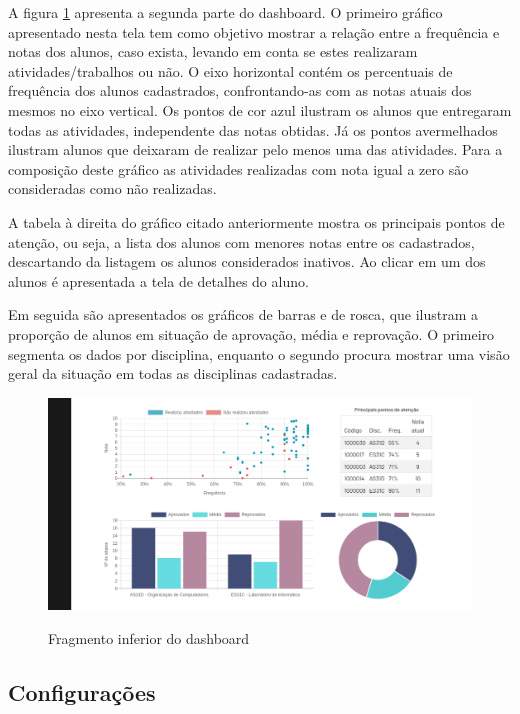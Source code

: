 A figura \ref{fig:dashboard-2} apresenta a segunda parte do dashboard. 
O primeiro gráfico apresentado nesta tela tem como objetivo mostrar a relação entre a frequência e notas dos alunos, caso exista, levando em conta se estes realizaram atividades/trabalhos ou não.
O eixo horizontal contém os percentuais de frequência dos alunos cadastrados, confrontando-as com as notas atuais dos mesmos no eixo vertical. 
Os pontos de cor azul ilustram os alunos que entregaram todas as atividades, independente das notas obtidas. 
Já os pontos avermelhados ilustram alunos que deixaram de realizar pelo menos uma das atividades.
Para a composição deste gráfico as atividades realizadas com nota igual a zero são consideradas como não realizadas.

A tabela à direita do gráfico citado anteriormente mostra os principais pontos de atenção, ou seja, a lista dos alunos com menores notas entre os cadastrados, descartando da listagem os alunos considerados inativos. Ao clicar em um dos alunos é apresentada a tela de detalhes do aluno.

Em seguida são apresentados os gráficos de barras e de rosca, que ilustram a proporção de alunos em situação de aprovação, média e reprovação. O primeiro segmenta os dados por disciplina, enquanto o segundo procura mostrar uma visão geral da situação em todas as disciplinas cadastradas.

\begin{figure}[!htb]
    \centering
    \caption{Fragmento inferior do dashboard}
    \includegraphics[width=1\textwidth]{./dados/figuras/sistema/sistema-dashboard-2}
    \label{fig:dashboard-2}
\end{figure}

\subsection{Configurações}
\label{ssec:configuracoes}

